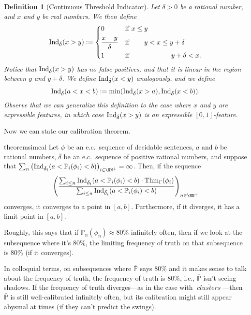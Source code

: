 \documentclass[authordate,onecolumn,noenvironments]{miri-tech-article}
\newtheorem{definition}[theorem]{Definition}
\numberwithin{equation}{subsection}
\newcommand{\seq}[1]{{\overline{#1}}}
\newcommand{\nn}{n}
\newcommand{\phis}{\seq{\phi}}
\newcommand{\deltas}{\seq{\delta}}
\newcommand{\ec}[1][\ ]{e.c.#1}
\newcommand{\rparenthetical}[1]{\hfill\upshape{{\small (#1)}}} %
\newcommand{\proofin}[1]{\rparenthetical{Proof in:~#1.}}
\newcommand{\BelState}{\mathbb{P}}
\newcommand{\pt}{\BelState}
\newcommand{\MP}{\seq{\pt}}
\newcommand{\Theory}{\Gamma}
\newcommand{\clusters}{\mathit{\operatorname{clusters}}}
\newcommand{\ctsind}[1]{\operatorname{Ind}_{\text{\small{${#1}$}}}} %
\newcommand{\thmind}[1][\Theory]{\operatorname{Thm}_{#1}\-} %
\begin{document}
\begin{definition}[Continuous Threshold Indicator]\label{def:ctsind}
  Let $\delta > 0$ be a rational number, and $x$ and $y$ be real numbers. We then define
  \[
    \ctsind{\delta}(x > y) :=
    \begin{dcases}
      0&\text{if }  x\leq y\\
      \frac{x-y}{\delta} &\text{if }\hphantom{x\leq\;} y < x\leq y+\delta\\
      1&\text{if } \hphantom{y\leq\; y < x\leq\;} y+\delta < x.
    \end{dcases}
  \]
  Notice that $\ctsind{\delta}(x > y)$ has no false positives, and that it is linear in the region between $y$ and $y+\delta$. We define $\ctsind{\delta}(x < y)$ analogously, and we define
  \[
    \ctsind{\delta}(a < x < b) := \min( \ctsind{\delta}(x > a), \ctsind{\delta}(x < b) ).
  \]
  Observe that we can generalize this definition to the case where $x$ and $y$ are expressible features, in which case ${\ctsind{\delta}(x > y)}$ is an expressible $[0,1]$-feature.
\end{definition}

Now we can state our calibration theorem.

\begin{restatable}{theorem}{simcal}\label{thm:simcal}
  Let $\phis$ be an \ec sequence of decidable sentences, $a$ and $b$ be rational numbers, $\deltas$ be an \ec sequence of positive rational numbers, and suppose that $\sum_\nn \left(\ctsind{\delta_i}(a<\pt_i(\phi_i)<b)\right)_{i \in \NN^+} = \infty$. Then, if the sequence
  \[
    \left(
    \frac
      {\sum_{i \leq \nn} \ctsind{\delta_i}(a < \pt_i(\phi_i) < b) \cdot \thmind(\phi_i)}
      {\sum_{i \leq \nn} \ctsind{\delta_i}(a < \pt_i(\phi_i) < b)}
    \right)_{\nn\in\NN^+}
  \]
  converges, it converges to a point in $[a, b]$. Furthermore, if it diverges, it has a limit point in $[a, b]$.
  \proofin{\ref{app:simcal}}
\end{restatable}

\noindent Roughly, this says that if $\pt_\nn(\phi_\nn)\approx 80\%$ infinitely often, then if we look at the subsequence where it's 80\%, the limiting frequency of truth on that subsequence is 80\% (if it converges).

In colloquial terms, on subsequences where $\MP$ says 80\% and it makes sense to talk about the frequency of truth, the frequency of truth is 80\%, i.e., $\MP$ isn't seeing shadows. If the frequency of truth diverges---as in the case with $\seq\clusters$---then $\MP$ is still well-calibrated infinitely often, but its calibration might still appear abysmal at times (if they can't predict the swings).
\end{document}
